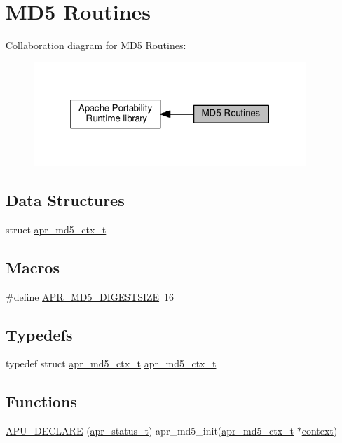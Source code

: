 \hypertarget{group__APR__MD5}{}\section{M\+D5 Routines}
\label{group__APR__MD5}
Collaboration diagram for M\+D5 Routines\+:
\nopagebreak
\begin{figure}[H]
\begin{center}
\leavevmode
\includegraphics[width=292pt]{group__APR__MD5}
\end{center}
\end{figure}
\subsection*{Data Structures}
\begin{DoxyCompactItemize}
\item 
struct \hyperlink{structapr__md5__ctx__t}{apr\+\_\+md5\+\_\+ctx\+\_\+t}
\end{DoxyCompactItemize}
\subsection*{Macros}
\begin{DoxyCompactItemize}
\item 
\#define \hyperlink{group__APR__MD5_ga0bb65e74ccdddca6ef75e886084e52dc}{A\+P\+R\+\_\+\+M\+D5\+\_\+\+D\+I\+G\+E\+S\+T\+S\+I\+ZE}~16
\end{DoxyCompactItemize}
\subsection*{Typedefs}
\begin{DoxyCompactItemize}
\item 
typedef struct \hyperlink{structapr__md5__ctx__t}{apr\+\_\+md5\+\_\+ctx\+\_\+t} \hyperlink{group__APR__MD5_gacb4d6bf2cf0a29553a63273ff0a6fe69}{apr\+\_\+md5\+\_\+ctx\+\_\+t}
\end{DoxyCompactItemize}
\subsection*{Functions}
\begin{DoxyCompactItemize}
\item 
\hyperlink{group__APR__MD5_ga2d76b11d8239c447732558e74ac399b1}{A\+P\+U\+\_\+\+D\+E\+C\+L\+A\+RE} (\hyperlink{group__apr__errno_gaa5105fa83cc322f09382292db8b47593}{apr\+\_\+status\+\_\+t}) apr\+\_\+md5\+\_\+init(\hyperlink{structapr__md5__ctx__t}{apr\+\_\+md5\+\_\+ctx\+\_\+t} $\ast$\hyperlink{pcregrep_8txt_a651ed26971b1d49911883c4eb87db1ad}{context})
\end{DoxyCompactItemize}

